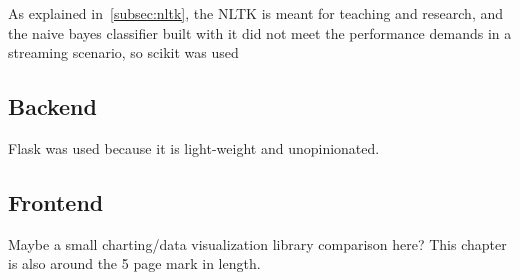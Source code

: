 As explained in~\ref{subsec:nltk}, the NLTK is meant for teaching and research,
and the naive bayes classifier built with it did not meet the performance demands in a streaming scenario,
so scikit was used

\subsection{Backend}
\label{subsec:backend}

Flask was used because it is light-weight and unopinionated.

\subsection{Frontend}
\label{subsec:frontend}

Maybe a small charting/data visualization library comparison here?
This chapter is also around the 5 page mark in length.
\pagebreak[5]